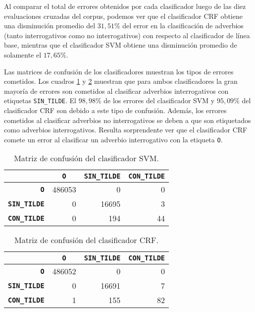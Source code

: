\documentclass[runningheads,a4paper]{llncs}
\begin{document}
Al comparar el total de errores obtenidos por cada clasificador luego de las diez evaluaciones cruzadas del corpus, podemos ver que el clasificador CRF obtiene una disminución promedio del $31,51\%$ del error en la clasificación de adverbios (tanto interrogativos como no interrogativos) con respecto al clasificador de línea base, mientras que el clasificador SVM obtiene una disminución promedio de solamente el $17,65\%$. 

Las matrices de confusi\'on de los clasificadores muestran los tipos de errores cometidos. Los cuadros \ref{table:confusion-svm} y \ref{table:confusion-crf} muestran que para ambos clasificadores la gran mayor\'ia de errores son cometidos al clasificar adverbios interrogativos con etiquetas \texttt{\small SIN\_TILDE}. El $98,98\%$ de los errores del clasificador SVM y $95,09\%$ del clasificador CRF son debido a este tipo de confusi\'on. Además, los errores cometidos al clasificar adverbios no interrogativos se deben a que son etiquetados como adverbios interrogativos. Resulta sorprendente ver que el clasificador CRF comete un error al clasificar un adverbio interrogativo con la etiqueta \texttt{\small O}.

\begin{table}[ht]
 	\renewcommand{\arraystretch}{1.3}
	\renewcommand{\tabcolsep}{3pt}
	\caption{Matriz de confusión del clasificador SVM.}
	\label{table:confusion-svm}
	\centering
	\begin{tabular}{|r||r|r|r|}
		\hline
			& \multicolumn{1}{c|}{\textbf{\texttt{~O~}}}
			& \multicolumn{1}{c|}{\textbf{\texttt{SIN\_TILDE}}}
			& \multicolumn{1}{c|}{\textbf{\texttt{CON\_TILDE}}} \\
		\hline\hline
		\textbf{\texttt{O}}			 & 486053 & 0 & 0 \\ \hline
		\textbf{\texttt{SIN\_TILDE}} & 0 & 16695 & 3 \\ \hline
		\textbf{\texttt{CON\_TILDE}} & 0 & 194 & 44 \\ 
		\hline
	\end{tabular}
\end{table}

\begin{table}[ht]
	\addtolength{\abovecaptionskip}{-10mm}
 	\renewcommand{\arraystretch}{1.3}
	\renewcommand{\tabcolsep}{3pt}
	\caption{Matriz de confusión del clasificador CRF.}
	\label{table:confusion-crf}
	\centering
	\begin{tabular}{|r||r|r|r|}
		\hline
			& \multicolumn{1}{c|}{\textbf{\texttt{~O~}}}
			& \multicolumn{1}{c|}{\textbf{\texttt{SIN\_TILDE}}}
			& \multicolumn{1}{c|}{\textbf{\texttt{CON\_TILDE}}} \\
		\hline\hline
		\textbf{\texttt{O}}			 & 486052 & 0 & 0 \\ \hline
		\textbf{\texttt{SIN\_TILDE}} & 0 & 16691 & 7 \\ \hline
		\textbf{\texttt{CON\_TILDE}} & 1 & 155 & 82 \\ 
		\hline
	\end{tabular}
\end{table}
\end{document}

